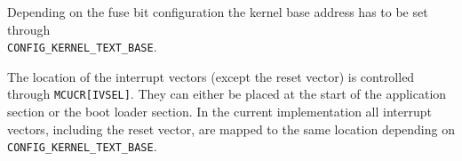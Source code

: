 		Depending on the fuse bit configuration the kernel base address has to be set through\\\lstinline{CONFIG_KERNEL_TEXT_BASE}. 

		The location of the interrupt vectors (except the reset vector) is controlled through \lstinline{MCUCR[IVSEL]}. They can either be placed at the start of the application section or the boot loader section. In the current implementation all interrupt vectors, including the reset vector, are mapped to the same location depending on \lstinline{CONFIG_KERNEL_TEXT_BASE}.
